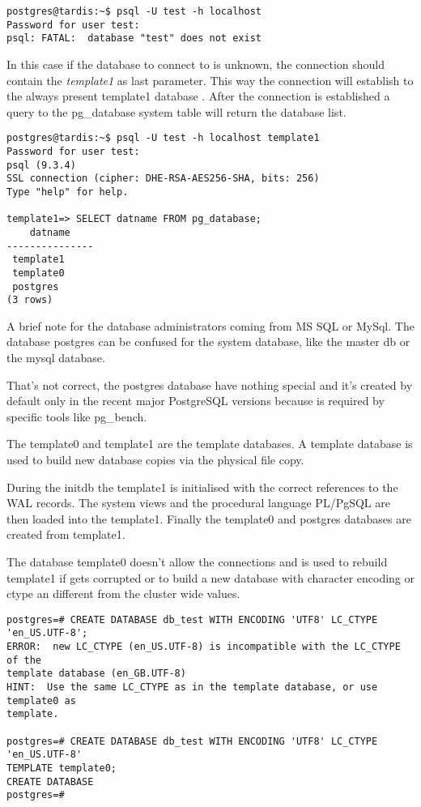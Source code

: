 \begin{verbatim}
postgres@tardis:~$ psql -U test -h localhost
Password for user test: 
psql: FATAL:  database "test" does not exist
\end{verbatim}

In this case if the database to connect to is unknown, the connection should 
contain the \textit{template1} as last parameter. This way the connection will 
establish to the always present template1 database . 
After the connection is 
established a query to the pg\_database system table will return the database 
list.

\begin{verbatim}
postgres@tardis:~$ psql -U test -h localhost template1
Password for user test: 
psql (9.3.4)
SSL connection (cipher: DHE-RSA-AES256-SHA, bits: 256)
Type "help" for help.

template1=> SELECT datname FROM pg_database;
    datname    
---------------
 template1
 template0
 postgres
(3 rows)

\end{verbatim}

A brief note for the database administrators coming from MS SQL or MySql.
The database postgres can be confused for the system database, like the master 
db or the mysql database. 

That's not correct, the postgres database have nothing 
special and it's created by default only in the recent major PostgreSQL 
versions because is required by specific tools like pg\_bench.

The template0 and template1   are the template databases. A template database  is used to build new database copies via the physical file copy. 

During the initdb the template1 is initialised with the correct references to 
the WAL records. The system views and the procedural language PL/PgSQL are then
loaded into the template1. Finally the template0 and postgres databases are 
created from template1.

The database template0 doesn't allow the connections and is used to rebuild 
template1 if gets corrupted or to build a new database with 
character encoding or ctype an different from the cluster wide values. 

\begin{verbatim}
postgres=# CREATE DATABASE db_test WITH ENCODING 'UTF8' LC_CTYPE 'en_US.UTF-8';
ERROR:  new LC_CTYPE (en_US.UTF-8) is incompatible with the LC_CTYPE of the 
template database (en_GB.UTF-8)
HINT:  Use the same LC_CTYPE as in the template database, or use template0 as 
template.

postgres=# CREATE DATABASE db_test WITH ENCODING 'UTF8' LC_CTYPE 'en_US.UTF-8' 
TEMPLATE template0;
CREATE DATABASE
postgres=# 

\end{verbatim}

